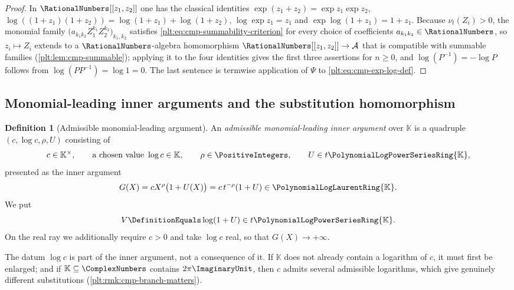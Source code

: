 \documentclass[11pt,oneside]{article}
\theoremstyle{plain}
\theoremstyle{definition}
\newtheorem{definition}[theorem]{Definition}
\theoremstyle{remark}
\newcommand{\K}{\mathbb{K}}
\newcommand{\PLpow}{\PolynomialLogPowerSeriesRing{\K}}   %
\newcommand{\PLlau}{\PolynomialLogLaurentRing{\K}}       %
\newcommand{\ordt}{\nu_{t}}                              %
\begin{document}
\begin{proof}
In \(\RationalNumbers[[z_1,z_2]]\) one has the classical identities
\(\exp(z_1+z_2)=\exp z_1\exp z_2\),
\(\log((1+z_1)(1+z_2))=\log(1+z_1)+\log(1+z_2)\),
\(\log\exp z_1=z_1\) and \(\exp\log(1+z_1)=1+z_1\).  Because
\(\ordt(Z_i)>0\), the monomial family
\(\bigl(a_{k_1k_2}Z_1^{k_1}Z_2^{k_2}\bigr)_{k_1,k_2}\) satisfies
\eqref{plt:eq:cmp-summability-criterion} for every choice of coefficients
\(a_{k_1k_2}\in\RationalNumbers\), so \(z_i\mapsto Z_i\) extends to a
\(\RationalNumbers\)-algebra homomorphism
\(\RationalNumbers[[z_1,z_2]]\to\mathcal A\) that is compatible with summable
families (\cref{plt:lem:cmp-summable}); applying it to the four identities gives the
first three assertions for \(n\ge0\), and \(\log(P^{-1})=-\log P\) follows
from \(\log(PP^{-1})=\log1=0\).  The last sentence is termwise application of
\(\Psi\) to \eqref{plt:eq:cmp-exp-log-def}.
\end{proof}

\subsection{Monomial-leading inner arguments and the substitution homomorphism}
\label{plt:sec:cmp-monomial-leading}

\begin{definition}[Admissible monomial-leading argument]
\label{plt:def:cmp-admissible-inner}
An \emph{admissible monomial-leading inner argument} over \(\K\) is a
quadruple \((c,\log c,\rho,U)\) consisting of
\[
 c\in\K^\times,
 \qquad
 \text{a chosen value }\log c\in\K,
 \qquad
 \rho\in\PositiveIntegers,
 \qquad
 U\in t\PLpow ,
\]
presented as the inner argument
\begin{equation}\label{plt:eq:cmp-G-monomial}
 G(X)=cX^{\rho}\bigl(1+U(X)\bigr)
 = c\,t^{-\rho}(1+U)\in\PLlau .
\end{equation}
We put
\begin{equation}\label{plt:eq:cmp-V-def}
 V\DefinitionEquals\log(1+U)\in t\PLpow .
\end{equation}
On the real ray we additionally require \(c>0\) and take \(\log c\) real, so
that \(G(X)\to+\infty\).
\end{definition}

The datum \(\log c\) is part of the inner argument, not a consequence of it.
If \(\K\) does not already contain a logarithm of \(c\), it must first be
enlarged; and if \(\K\subseteq\ComplexNumbers\) contains \(2\pi\ImaginaryUnit\),
then \(c\) admits several admissible logarithms, which give genuinely
different substitutions (\cref{plt:rmk:cmp-branch-matters}).
\end{document}
